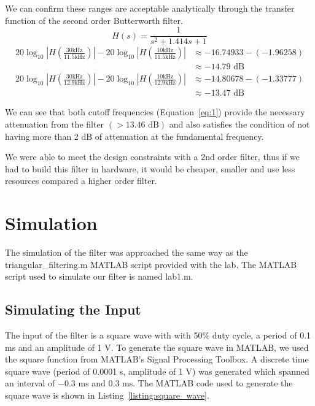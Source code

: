 \documentclass[12pt]{article}
\begin{document}
We can confirm these ranges are acceptable analytically through the transfer function of the second order Butterworth filter.
\begin{equation*}
    H(s) = \frac{1}{s^2 + 1.414s + 1}
\end{equation*}
\begin{equation}
\begin{aligned}
    20\log_{10}{\left|H\left(\frac{30 \text{kHz}}{11.5 \text{kHz}}\right)\right|} - 20\log_{10}{\left|H\left(\frac{10 \text{kHz}}{11.5 \text{kHz}}\right)\right|} &\approx -16.74933 - (-1.96258) \\
    &\approx -14.79 \text{ dB}
\end{aligned}
\end{equation}
\begin{equation}
\begin{aligned}
    20\log_{10}{\left|H\left(\frac{30 \text{kHz}}{12.9 \text{kHz}}\right)\right|} - 20\log_{10}{\left|H\left(\frac{10 \text{kHz}}{12.9 \text{kHz}}\right)\right|} &\approx -14.80678 - (-1.33777) \\
    &\approx -13.47 \text{ dB}
\end{aligned}
\end{equation}

We can see that both cutoff frequencies (Equation~\ref{eq:1}) provide the necessary attenuation from the filter $(> 13.46 \text{ dB})$ and also satisfies the condition of not having more than 2 dB of attenuation at the fundamental frequency.

We were able to meet the design constraints with a 2nd order filter, thus if we had to build this filter in hardware, it would be cheaper, smaller and use less resources compared a higher order filter.

\clearpage
\section*{Simulation}
The simulation of the filter was approached the same way as the triangular\_filtering.m MATLAB script provided with the lab. The MATLAB script used to simulate our filter is named lab1.m.

\subsection*{Simulating the Input}
The input of the filter is a square wave with with 50\% duty cycle, a period of 0.1 ms and an amplitude of 1 V. To generate the square wave in MATLAB, we used the square function from MATLAB's Signal Processing Toolbox. A discrete time square wave (period of 0.0001 s, amplitude of 1 V) was generated which spanned an interval of $-0.3$ ms and $0.3$ ms. The MATLAB code used to generate the square wave is shown in Listing~\ref{listing:square_wave}.

\end{document}
